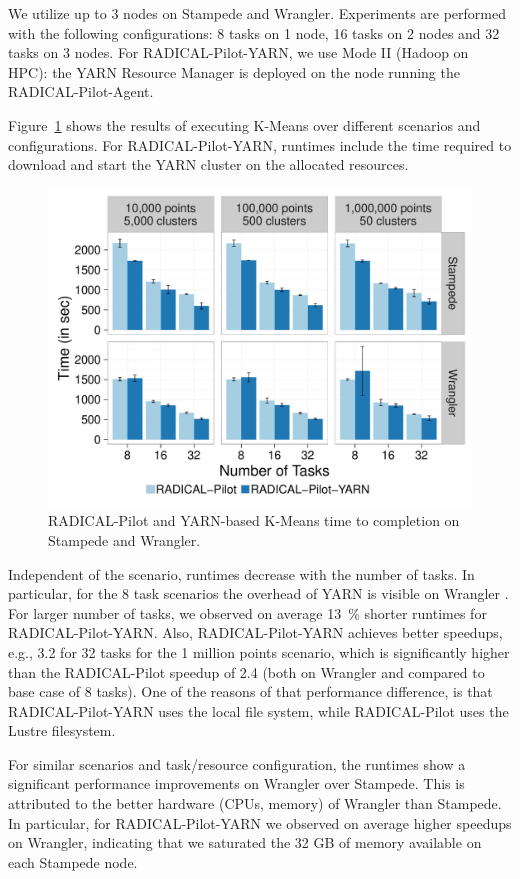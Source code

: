 We utilize up to 3 nodes on Stampede and Wrangler. Experiments are performed
with the following configurations: 8 tasks on 1 node, 16 tasks on 2 nodes and 32
tasks on 3 nodes. For RADICAL-Pilot-YARN, we use Mode II (Hadoop on HPC): the
YARN Resource Manager is deployed on the node running the RADICAL-Pilot-Agent.

Figure~\ref{fig:experiments_kmeans_rpyarnkmeans} shows the results of executing
K-Means over different scenarios and configurations. For RADICAL-Pilot-YARN,
runtimes include the time required to download and start the YARN cluster on the
allocated resources.

\begin{figure}[t]
    \centering
    \includegraphics[width=.75\textwidth]{figures/data_analytics_hpc/hpc_hadoop/kmeans.pdf}
    \caption{RADICAL-Pilot and YARN-based K-Means time to completion on Stampede and Wrangler.}
    \label{fig:experiments_kmeans_rpyarnkmeans}
\end{figure}

Independent of the scenario, runtimes decrease with the number of tasks. In
particular, for the 8 task scenarios the overhead of YARN is visible on Wrangler
. For larger number of
tasks, we observed on average 13~\% shorter runtimes for RADICAL-Pilot-YARN.
Also, RADICAL-Pilot-YARN achieves better speedups, e.g., 3.2 for 32 tasks for
the 1 million points scenario, which is significantly higher than the
RADICAL-Pilot speedup of 2.4 (both on Wrangler and compared to base case of 8
tasks). One of the reasons of that performance difference, is that
RADICAL-Pilot-YARN uses the local file system, while RADICAL-Pilot uses the
Lustre filesystem.

For similar scenarios and task/resource configuration, the runtimes show a
significant performance improvements on Wrangler over Stampede. This is
attributed to the better hardware (CPUs, memory) of Wrangler than Stampede. In
particular, for RADICAL-Pilot-YARN we observed on average higher speedups on
Wrangler, indicating that we saturated the 32 GB of memory available on each
Stampede node.

